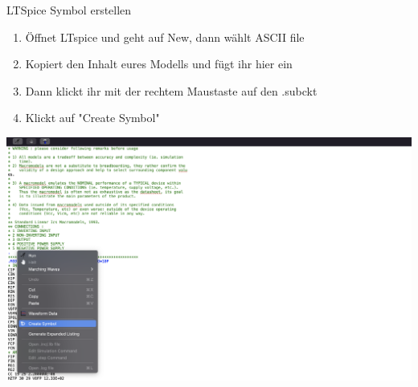 \begin{frame}[t]{LTSpice Symbol erstellen} 

    \begin{enumerate}
        \item Öffnet LTspice und geht auf New, dann wählt ASCII file
        \item Kopiert den Inhalt eures Modells und fügt ihr hier ein
        \item Dann klickt ihr mit der rechtem Maustaste auf den .subckt
        \item Klickt auf "Create Symbol"
    \end{enumerate}


    \begin{spacing}{0.9} \begin{tiny}
        \begin{minipage}{\textwidth}
          \includegraphics[width=0.6\linewidth]{pictures/ModelCreation.png}
        \end{minipage}
    \end{tiny} \end{spacing}

\end{frame}


